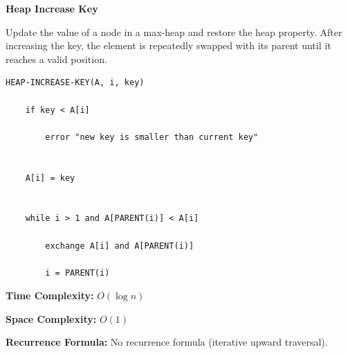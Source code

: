 \documentclass[a4paper,12pt]{article}
\begin{document}
\begin{tcolorbox}[
    colback=gray!30,
    colframe=black,
    boxrule=1pt,
    arc=0mm
]

\begin{tcolorbox}[
    colback=gray!10,
    colframe=black,
    arc=0mm
]
\centering
{\Huge\bfseries Heap Increase Key}
\end{tcolorbox}


\begin{tcolorbox}[
    colback=gray!10,
    colframe=black,
    arc=0mm
]
\small
Update the value of a node in a max-heap and restore the heap property.
After increasing the key, the element is repeatedly swapped with its parent
until it reaches a valid position.
\end{tcolorbox}


\begin{tcolorbox}[
    colback=black!5,
    colframe=black,
    arc=0mm,
    title=Pseudo-code
]
\tiny
\begin{lstlisting}
HEAP-INCREASE-KEY(A, i, key)

    if key < A[i]

        error "new key is smaller than current key"


    A[i] = key


    while i > 1 and A[PARENT(i)] < A[i]

        exchange A[i] and A[PARENT(i)]

        i = PARENT(i)
\end{lstlisting}
\end{tcolorbox}


\begin{tcolorbox}[
    colback=cyan!20,
    colframe=black,
    arc=0mm
]
\small
\textbf{Time Complexity:}
$O(\log n)$
\end{tcolorbox}


\begin{tcolorbox}[
    colback=violet!20,
    colframe=black,
    arc=0mm
]
\small
\textbf{Space Complexity:}
$O(1)$
\end{tcolorbox}


\begin{tcolorbox}[
    colback=pink!20,
    colframe=black,
    arc=0mm
]
\small
\textbf{Recurrence Formula:}
No recurrence formula (iterative upward traversal).
\end{tcolorbox}

\end{tcolorbox}
\end{document}
